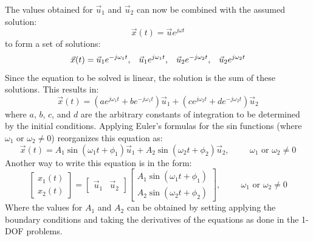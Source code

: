 \documentclass[12pt,letter]{article}
\begin{document}
	The values obtained for $\vec{u}_1$ and $\vec{u}_2$ can now be combined with the assumed solution:
	\begin{equation}
		\vec{x}(t) = \vec{u}e^{j\omega t}
	\end{equation}
	to form a set of solutions:
	\begin{equation}
		\vec{x}(t) = \vec{u}_1e^{-j\omega_1 t}, \hspace{2ex} \vec{u}_1e^{j\omega_1 t}, \hspace{2ex} \vec{u}_2e^{-j\omega_2 t}, \hspace{2ex} \vec{u}_2e^{j\omega_2 t}
	\end{equation}
	Since the equation to be solved is linear, the solution is the sum of these solutions. This results in:
	\begin{equation}
		\vec{x}(t) = (a e^{j\omega_1 t} + b e^{-j\omega_1 t})\vec{u}_1 +(c e^{j\omega_2 t} + d e^{-j\omega_2 t})\vec{u}_2
	\end{equation}
	where $a$, $b$, $c$, and $d$ are the arbitrary constants of integration to be determined by the initial conditions. Applying Euler's formulas for the sin functions (where $\omega_1 \text{ or } \omega_2 \neq 0$) reorganizes this equation as:
	\begin{equation}
		\vec{x}(t) = A_1 \sin (\omega_1 t + \phi_1 )\vec{u}_1 + A_2 \sin (\omega_2 t + \phi_2 )\vec{u}_2 , \hspace{1cm} \omega_1 \text{ or } \omega_2 \neq 0
	\end{equation}
	Another way to write this equation is in the form:
	\begin{equation}
		 \begin{bmatrix} x_1(t) \\  x_2(t) \end{bmatrix} =  \begin{bmatrix} \vec{u}_1 & \vec{u}_2 \end{bmatrix}
		 \begin{bmatrix} A_1 \sin (\omega_1 t + \phi_1 )\\ A_2 \sin (\omega_2 t + \phi_2 )\end{bmatrix}, \hspace{1cm} \omega_1 \text{ or } \omega_2 \neq 0
	\end{equation}
	Where the values for $A_1$ and $A_2$ can be obtained by setting applying the boundary conditions and taking the derivatives of the equations as done in the 1-DOF problems. 
	
\end{document}
